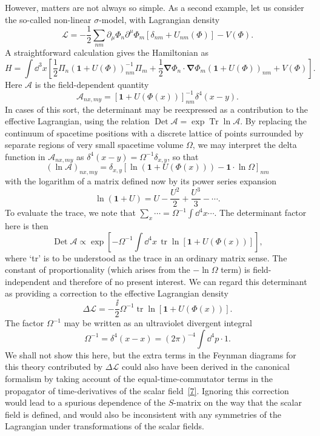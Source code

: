 However, matters are not always so simple. As a second example, let us
consider the so-called non-linear $\sigma$-model, with Lagrangian density
\[
\mathcal L=-\frac12\sum_{nm}\partial_\mu\Phi_n\partial^\mu\Phi_m
 [\delta_{nm}+U_{nm}(\Phi)]-V(\Phi).
\]
A straightforward calculation gives the Hamiltonian as
\[
H=\int \dd^3x\left[\frac12\Pi_n(\mathbf{1}+U(\Phi))^{-1}_{nm}\Pi_m
 +\frac12\boldsymbol\nabla\Phi_n\cdot\boldsymbol\nabla\Phi_m
 (\mathbf{1}+U(\Phi))_{nm}+V(\Phi)\right].
\]
Here $\mathcal A$ is the field-dependent quantity
\[
\mathcal A_{nx,my}=[\mathbf{1}+U(\Phi(x))]^{-1}_{nm}\delta^4(x-y).
\]
In cases of this sort, the determinant may be reexpressed as a contribution to
the effective Lagrangian, using the relation
$\operatorname{Det}\mathcal A=\exp\operatorname{Tr}\ln\mathcal A$. By
replacing the continuum of spacetime positions with a discrete lattice of
points surrounded by separate regions of very small spacetime volume $\Omega$,
we may interpret the delta function in $\mathcal A_{nx,my}$ as
$\delta^4(x-y)=\Omega^{-1}\delta_{x,y}$, so that
\[
(\ln\mathcal A)_{nx,my}=\delta_{x,y}
 \left[\ln(\mathbf{1}+U(\Phi(x)))-\mathbf{1}\cdot\ln\Omega\right]_{nm}
\]
with the logarithm of a matrix defined now by its power series expansion
\[
\ln(\mathbf{1}+U)=U-\frac{U^2}{2}+\frac{U^3}{3}-\cdots.
\]
To evaluate the trace, we note that
$\sum_x\cdots=\Omega^{-1}\int \dd^4x\cdots$. The determinant factor here is
then
\[
\operatorname{Det}\mathcal A\propto
 \exp\left[-\Omega^{-1}\int \dd^4x\,
 \operatorname{tr}\ln[\mathbf{1}+U(\Phi(x))]\right],
\]
where `tr' is to be understood as the trace in an ordinary matrix sense. The
constant of proportionality (which arises from the $-\ln\Omega$ term) is
field-independent and therefore of no present interest. We can regard this
determinant as providing a correction to the effective Lagrangian density
\[
\Delta\mathcal L=-\frac{\ii}{2}\Omega^{-1}
 \operatorname{tr}\ln[\mathbf{1}+U(\Phi(x))].
\]
The factor $\Omega^{-1}$ may be written as an ultraviolet divergent integral
\[
\Omega^{-1}=\delta^4(x-x)=(2\pi)^{-4}\int \dd^4p\cdot1.
\]
We shall not show this here, but the extra terms in the Feynman diagrams for
this theory contributed by $\Delta\mathcal L$ could also have been derived in
the canonical formalism by taking account of the equal-time-commutator terms
in the propagator of time-derivatives of the scalar field~\hyperref[ref:9.7]{[7]}. Ignoring this
correction would lead to a spurious dependence of the $S$-matrix on the way
that the scalar field is defined, and would also be inconsistent with any
symmetries of the Lagrangian under transformations of the scalar fields.

